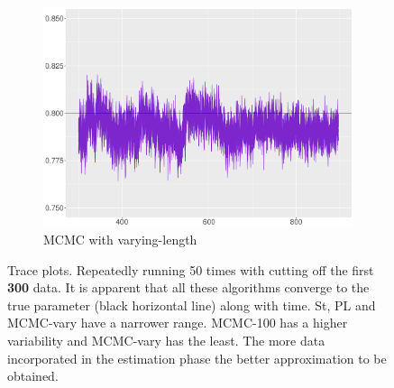 \begin{figure}[h]
\begin{subfigure}[t]{0.46\textwidth}
\includegraphics[width=\textwidth]{Chapters/04Filtering/plot/MCMCchainVary.pdf}
 \caption{MCMC with varying-length}
   \end{subfigure}
\caption{Trace plots. Repeatedly running 50 times with cutting off the first \textbf{300} data. It is apparent that all these algorithms converge to the true parameter (black horizontal line) along with time. St, PL and MCMC-vary have a narrower range. MCMC-100 has a higher variability and MCMC-vary has the least. The more data incorporated in the estimation phase the better approximation to be obtained. }\label{FilterRiewComparesion01}
\end{figure}

